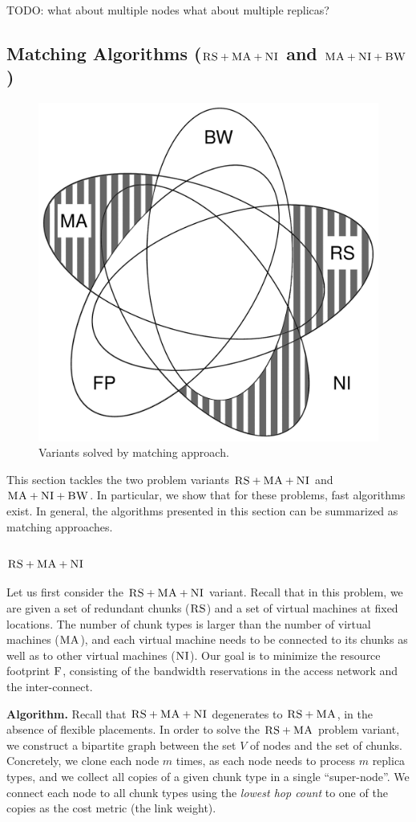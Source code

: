 \documentclass[9pt]{sigcomm-alternate}
\newcommand{\MaFactor}{m}
\newcommand{\ChunkType}{\tau}
\newcommand{\VirtualNodes}{\ensuremath{V}}
\newcommand{\CC}{\textsc{NI}}
\newcommand{\RS}{\textsc{RS}}
\newcommand{\BW}{\textsc{BW}}
\newcommand{\MA}{\textsc{MA}}
\newcommand{\Cost}{\textsc{F}}
\begin{document}

TODO: what about multiple nodes what about multiple replicas?

\subsection{Matching Algorithms ($\RS+\MA+\CC$ and $\MA+\CC+\BW$)}\label{ssec:match}

\begin{figure}
\includegraphics[width=0.48\columnwidth]{figs/venn_matching.pdf}
\caption{Variants solved by matching approach.}
\label{fig:venn_match}
\end{figure}

This section tackles the two problem variants
$\RS+\MA+\CC$ and $\MA+\CC+\BW$. In particular, we show that
for these problems, fast algorithms exist.
In general, the algorithms presented in this section can be summarized
as matching approaches.

\subsubsection{$\RS+\MA+\CC$}

Let us first consider the $\RS+\MA+\CC$ variant.
Recall that in this problem,
we are given a set of redundant chunks ($\RS$) and a set of virtual machines
at fixed locations. The number of chunk types is larger than the number
of virtual machines ($\MA$), and each virtual machine needs to be connected
to its chunks as well as to other virtual machines ($\CC$).
Our goal is to minimize the resource footprint $\Cost$, consisting
of the bandwidth reservations in the access network and the inter-connect.

\textbf{Algorithm.} Recall that $\RS+\MA+\CC$ degenerates to $\RS+\MA$,
in the absence of flexible placements.
In order to solve the $\RS+\MA$ problem variant,
we construct a bipartite
graph between the set
$\VirtualNodes$ of nodes and
the set of chunks.
Concretely, we clone each node $\MaFactor$ times,
as each node needs to process
$\MaFactor$ replica types, and we collect all copies of a given chunk type in a
single %
``super-node''. We connect each node to all chunk types using the
\emph{lowest hop count} to one of the copies as the cost metric (the link weight).
\end{document}
